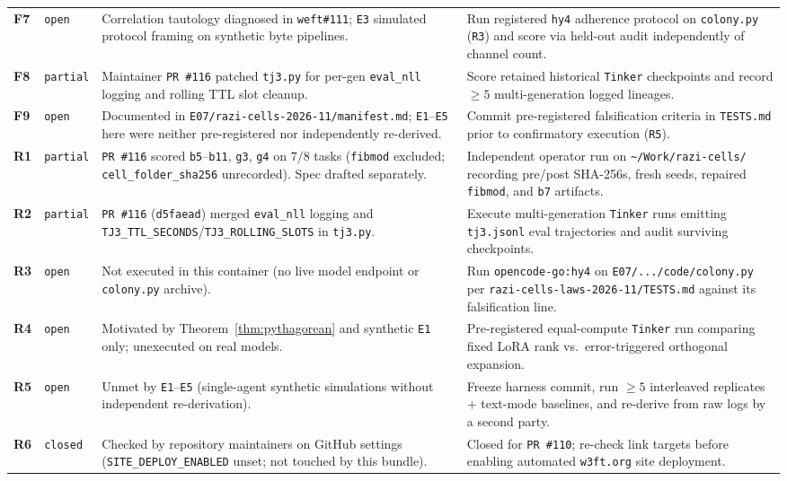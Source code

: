 \documentclass[10pt,a4paper]{article}
\begin{document}
\begin{table}[!htbp]
\begin{tabularx}{\linewidth}{@{}l l >{\raggedright\arraybackslash}X >{\raggedright\arraybackslash}X@{}}
\textbf{F7} & \texttt{open} & Correlation tautology diagnosed in \texttt{weft\#111}; \texttt{E3} simulated protocol framing on synthetic byte pipelines. & Run registered \texttt{hy4} adherence protocol on \texttt{colony.py} (\texttt{R3}) and score via held-out audit independently of channel count. \\
\textbf{F8} & \texttt{partial} & Maintainer \texttt{PR \#116} patched \texttt{tj3.py} for per-gen \texttt{eval\_nll} logging and rolling TTL slot cleanup. & Score retained historical \texttt{Tinker} checkpoints and record $\ge 5$ multi-generation logged lineages. \\
\textbf{F9} & \texttt{open} & Documented in \texttt{E07/razi-cells-2026-11/manifest.md}; \texttt{E1}--\texttt{E5} here were neither pre-registered nor independently re-derived. & Commit pre-registered falsification criteria in \texttt{TESTS.md} prior to confirmatory execution (\texttt{R5}). \\
\midrule
\textbf{R1} & \texttt{partial} & \texttt{PR \#116} scored \texttt{b5}--\texttt{b11}, \texttt{g3}, \texttt{g4} on $7/8$ tasks (\texttt{fibmod} excluded; \texttt{cell\_folder\_sha256} unrecorded). Spec drafted separately. & Independent operator run on \texttt{\textasciitilde/Work/razi-cells/} recording pre/post SHA-256s, fresh seeds, repaired \texttt{fibmod}, and \texttt{b7} artifacts. \\
\textbf{R2} & \texttt{partial} & \texttt{PR \#116} (\texttt{d5faead}) merged \texttt{eval\_nll} logging and \texttt{TJ3\_TTL\_SECONDS}/\texttt{TJ3\_ROLLING\_SLOTS} in \texttt{tj3.py}. & Execute multi-generation \texttt{Tinker} runs emitting \texttt{tj3.jsonl} eval trajectories and audit surviving checkpoints. \\
\textbf{R3} & \texttt{open} & Not executed in this container (no live model endpoint or \texttt{colony.py} archive). & Run \texttt{opencode-go:hy4} on \texttt{E07/.../code/colony.py} per \texttt{razi-cells-laws-2026-11/TESTS.md} against its falsification line. \\
\textbf{R4} & \texttt{open} & Motivated by Theorem~\ref{thm:pythagorean} and synthetic \texttt{E1} only; unexecuted on real models. & Pre-registered equal-compute \texttt{Tinker} run comparing fixed LoRA rank vs.\ error-triggered orthogonal expansion. \\
\textbf{R5} & \texttt{open} & Unmet by \texttt{E1}--\texttt{E5} (single-agent synthetic simulations without independent re-derivation). & Freeze harness commit, run $\ge 5$ interleaved replicates + text-mode baselines, and re-derive from raw logs by a second party. \\
\textbf{R6} & \texttt{closed} & Checked by repository maintainers on GitHub settings (\texttt{SITE\_DEPLOY\_ENABLED} unset; not touched by this bundle). & Closed for \texttt{PR \#110}; re-check link targets before enabling automated \texttt{w3ft.org} site deployment. \\
\bottomrule
\end{tabularx}
\end{table}
\end{document}
